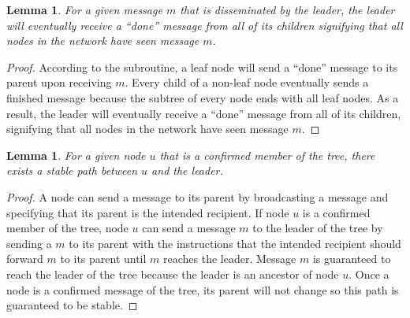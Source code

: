 \documentclass[english]{article}
\newtheorem{lemma}[theorem]{Lemma}
\begin{document}
\begin{lemma}
\label{StaticConfirmationMessage}
For a given message $m$ that is disseminated by the leader, the leader will eventually receive a ``done'' message from all of its children signifying that all nodes in the network have seen message $m$.
\end{lemma}
\begin{proof}

According to the subroutine, a leaf node will send a ``done'' message to its parent upon receiving $m$. Every child of a non-leaf node eventually sends a finished message because the subtree of every node ends with all leaf nodes. As a result, the leader will eventually receive a ``done'' message from all of its children, signifying that all nodes in the network have seen message $m$.

\end{proof}

\begin{lemma}
\label{StaticStablePath}
For a given node $u$ that is a confirmed member of the tree, there exists a stable path between $u$ and the leader.
\end{lemma}
\begin{proof}

A node can send a message to its parent by broadcasting a message and specifying that its parent is the intended recipient. If node $u$ is a confirmed member of the tree, node $u$ can send a message $m$ to the leader of the tree by sending a $m$ to its parent with the instructions that the intended recipient should forward $m$ to its parent until $m$ reaches the leader. Message $m$ is guaranteed to reach the leader of the tree because the leader is an ancestor of node $u$. Once a node is a confirmed message of the tree, its parent will not change so this path is guaranteed to be stable.

\end{proof}
\end{document}
